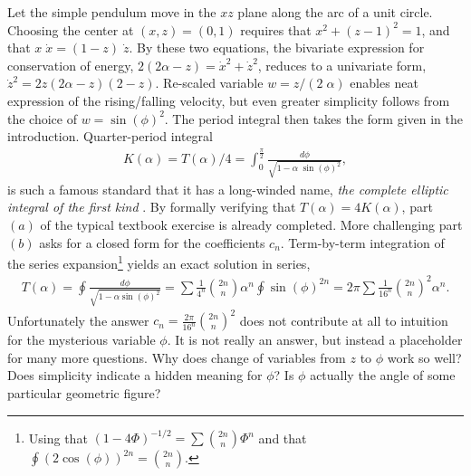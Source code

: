 \documentclass[nofootinbib,preprint]{revtex4-1}
\begin{document}
Let the simple pendulum move in the $xz$ plane along the arc of a unit circle. Choosing 
the center at $(x,z)=(0,1)$ requires that  $x^2+(z-1)^2=1$, and that $x\;\dot{x}=(1-z)\;\dot{z}$.
By these two equations, the bivariate expression for conservation of energy,
$2(2\alpha-z)=\dot{x}^2+\dot{z}^2$, reduces to a univariate form, $\dot{z}^2=2z(2\alpha-z)(2-z)$. 
Re-scaled variable 
$w=z/(2\;\alpha)$ enables neat expression of the rising/falling velocity, but even greater 
simplicity follows from the choice of $w=\sin(\phi)^2$. The period integral then takes 
the form given in the introduction. Quarter-period integral
\begin{eqnarray}
K(\alpha)=T(\alpha)/4=\int_{0}^{\frac{\pi}{2}} \frac{d\phi}{\sqrt{1-\alpha\;\sin(\phi)^2}}, 
\nonumber
\end{eqnarray}
is such a famous standard that it has a long-winded name, \textit{the complete elliptic 
integral of the first kind} \cite{LL1982}. By formally verifying that $T(\alpha)=4K(\alpha)$, 
part $(a)$ of the typical textbook exercise is already completed. More challenging part 
$(b)$ asks for a closed form for the coefficients $c_n$. Term-by-term integration of 
the series expansion\footnote{Using that $(1-4\Phi)^{-1/2} = \sum \binom{2n}{n}\Phi^n $ 
and that $\oint (2\cos(\phi))^{2n} = \binom{2n}{n}$.} yields an exact solution in 
series,
\begin{eqnarray}
T(\alpha)= \oint \frac{d\phi}{\sqrt{1-\alpha \sin(\phi)^2}}=\sum \frac{1}{4^n}\binom{2n}{n} \alpha^n \oint\sin(\phi)^{2n}= 
2\pi \sum \frac{1}{16^n}\binom{2n}{n}^2 \alpha^n. \nonumber 
\end{eqnarray}
Unfortunately the answer $c_n=\frac{2\pi}{16^n}\binom{2n}{n}^2 $ does not contribute at all 
to intuition for the mysterious variable $\phi$. It is not really an answer, but instead
a placeholder for many more questions. Why does change of variables from $z$ to $\phi$ 
work so well? Does simplicity indicate a hidden meaning for $\phi$? Is $\phi$ actually
the angle of some particular geometric figure? 
\end{document}
